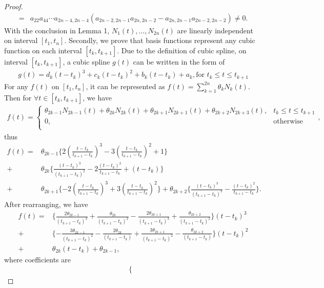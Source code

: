 \begin{proof}
\begin{align*}
=& a_{22}a_{44}\cdots a_{2n-4,2n-4} (a_{2n-2,2n-1}a_{2n,2n-2}-a_{2n,2n-1}a_{2n-2,2n-2}) \neq 0.
\end{align*}
With the conclusion in Lemma 1, $N_1(t),\ldots,N_{2n}(t)$  are linearly independent on interval $[t_1, t_n]$.
Secondly, we prove that basis functions represent any cubic function on each interval $[t_k, t_{k+1}]$. Due to the definition of cubic spline, on interval $[t_k, t_{k+1}]$, a cubic spline $g(t)$ can be written in the form of
\begin{eqnarray}
g(t)=d_k (t-t_k)^3+c_k(t-t_k)^2+b_k(t-t_k)+a_k, \mbox{for $t_k \leq t \leq t_{k+1}$}
\end{eqnarray}
For any $f(t)$ on $[t_1, t_n]$, it can be represented as $f(t)=\sum_{k=1}^{2n} \theta_k N_k(t)$. Then for $\forall t \in [t_k,t_{k+1}]$, we have
\begin{align*}
f(t)=\begin{cases}
\theta_{2k-1}N_{2k-1}(t)+\theta_{2k}N_{2k}(t)+\theta_{2k+1}N_{2k+1}(t)+\theta_{2k+2}N_{2k+3}(t), & t_k \leq t \leq t_{k+1}  \\
0, & \mbox{otherwise}\\
\end{cases},
\end{align*}
thus
\begin{align*}
f(t)=&\theta_{2k-1}\{ 2(\frac{t-t_{k}}{t_{k+1}-t_{k}})^3-3(\frac{t-t_{k}}{t_{k+1}-t_{k}})^2+1  \} \\+&\theta_{2k} \{  \frac{(t-t_{k})^3}{(t_{k+1}-t_{k})^2}-2\frac{(t-t_{k})^2}{t_{k+1}-t_{k}}+(t-t_{k}) \} \\
+&\theta_{2k+1} \{ -2(\frac{t-t_k}{t_{k+1}-t_k})^3+3(\frac{t-t_k}{t_{k+1}-t_k})^2  \}  +\theta_{2k+2} \{  \frac{(t-t_k)^3}{(t_{k+1}-t_k)^2}-\frac{(t-t_k)^2}{t_{k+1}-t_k} \}.
\end{align*}
After rearranging, we have
\begin{align*}
f(t)=& \{ \frac{2\theta_{2k-1}}{(t_{k+1}-t_{k})^3} +\frac{\theta_{2k}}{(t_{k+1}-t_{k})^2} -\frac{2\theta_{2k+1}}{(t_{k+1}-t_{k})^3} +\frac{\theta_{2k+2}}{(t_{k+1}-t_{k})^2} \} (t-t_k)^3 \\
+&  \{ -\frac{3\theta_{2k-1}}{(t_{k+1}-t_{k})^2} -\frac{2\theta_{2k}}{(t_{k+1}-t_{k})} +\frac{3\theta_{2k+1}}{(t_{k+1}-t_{k})^2} - \frac{\theta_{2k+2}}{(t_{k+1}-t_{k})} \} (t-t_k)^2 \\
+&  \theta_{2k} (t-t_k) +\theta_{2k-1},
\end{align*}
where coefficients are
\begin{align*}
\begin{cases}

\end{cases}
\end{align*}
\end{proof}
